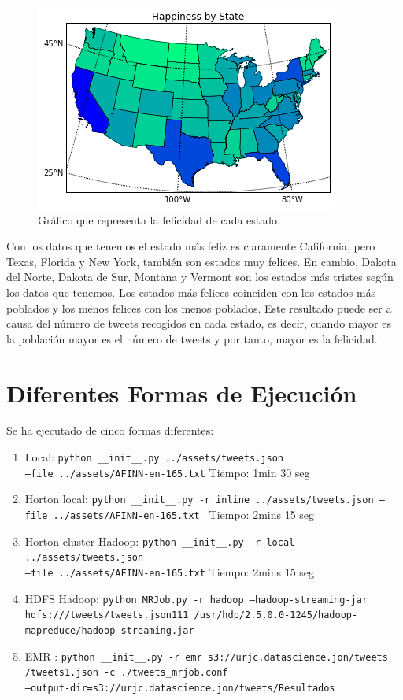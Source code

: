 \documentclass[12pt,a4paper]{article}
\begin{document}
\begin{figure}[h]
\centering
\includegraphics[scale=1]{happiness.png}
\caption{Gráfico que representa la felicidad de cada estado.}
\end{figure}

Con los datos que tenemos el estado más feliz es claramente California, pero Texas, Florida y New York, también son estados muy felices. En cambio, Dakota del Norte, Dakota de Sur, Montana y Vermont son los estados más tristes según los datos que tenemos. Los estados más felices coinciden con los estados más poblados  y los menos felices con los menos poblados. Este resultado puede ser a causa del número de tweets recogidos en cada estado, es decir, cuando mayor es la población mayor es el número de tweets y por tanto, mayor es la felicidad.

\section{Diferentes Formas de Ejecución}

Se ha ejecutado de cinco formas diferentes:
\begin{enumerate}
\item Local: \texttt{python \_\_init\_\_.py ../assets/tweets.json \\--file ../assets/AFINN-en-165.txt} Tiempo: 1min 30 seg
\item Horton local: \texttt{python \_\_init\_\_.py -r inline ../assets/tweets.json  --file ../assets/AFINN-en-165.txt } Tiempo: 2mins 15 seg
\item Horton cluster Hadoop: \texttt{python \_\_init\_\_.py -r local ../assets/tweets.json  \\ --file ../assets/AFINN-en-165.txt} Tiempo: 2mins 15 seg
\item HDFS Hadoop: \texttt{python MRJob.py -r hadoop --hadoop-streaming-jar \\ hdfs:///tweets/tweets.json111  /usr/hdp/2.5.0.0-1245/hadoop-\\mapreduce/hadoop-streaming.jar}
\item EMR : \texttt{python \_\_init\_\_.py -r emr s3://urjc.datascience.jon/tweets\\/tweets1.json -c ./tweets\_mrjob.conf \\--output-dir=s3://urjc.datascience.jon/tweets/Resultados}
\end{enumerate}
\end{document}
